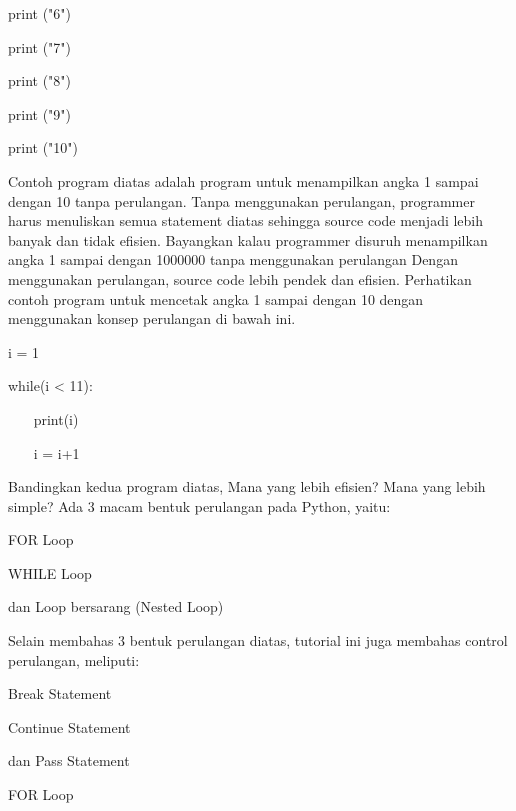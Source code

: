 print ("6") \par
print ("7") \par
print ("8") \par
print ("9") \par
print ("10") \par
\vspace{12pt}
\vspace{\baselineskip}
Contoh program diatas adalah program untuk menampilkan angka 1 sampai dengan 10 tanpa perulangan. Tanpa menggunakan perulangan, programmer harus menuliskan semua statement diatas sehingga source code menjadi lebih banyak dan tidak efisien. Bayangkan kalau programmer disuruh menampilkan angka 1 sampai dengan 1000000 tanpa menggunakan perulangan\vspace{\baselineskip}
\vspace{\baselineskip}
Dengan menggunakan perulangan, source code lebih pendek dan efisien. Perhatikan contoh program untuk mencetak angka 1 sampai dengan 10 dengan menggunakan konsep perulangan di bawah ini.\vspace{\baselineskip}
\vspace{\baselineskip}
 \par
\vspace{12pt}
i = 1 \par
while(i < 11): \par
~~~ print(i) \par
~~~ i = i+1 \par
\vspace{\baselineskip}
Bandingkan kedua program diatas, Mana yang lebih efisien? Mana yang lebih simple?\vspace{\baselineskip}
\vspace{\baselineskip}
Ada 3 macam bentuk perulangan pada Python, yaitu: \par
FOR Loop \par
WHILE Loop \par
dan Loop bersarang (Nested Loop) \par
\vspace{\baselineskip}
Selain membahas 3 bentuk perulangan diatas, tutorial ini juga membahas control perulangan, meliputi: \par
Break Statement \par
Continue Statement \par
dan Pass Statement \par
\vspace{\baselineskip}
\vspace{12pt}
FOR Loop \par
